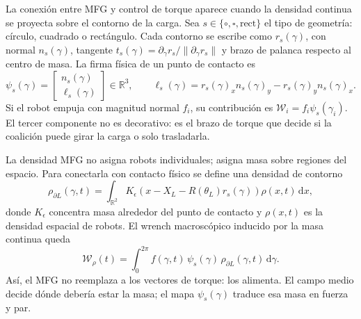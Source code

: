 La conexión entre MFG y control de torque aparece cuando la densidad continua se proyecta
sobre el contorno de la carga. Sea $s\in\{\circ,\square,\mathrm{rect}\}$ el tipo de
geometría: círculo, cuadrado o rectángulo. Cada contorno se escribe como
$r_s(\gamma)$, con normal $n_s(\gamma)$, tangente
$t_s(\gamma)=\partial_\gamma r_s/\|\partial_\gamma r_s\|$ y brazo de palanca respecto al
centro de masa. La firma física de un punto de contacto es
\begin{equation}
  \psi_s(\gamma)
  =
  \begin{bmatrix}
    n_s(\gamma)\\
    \ell_s(\gamma)
  \end{bmatrix}
  \in\mathbb R^3,
  \qquad
  \ell_s(\gamma)
  =
  r_s(\gamma)_x n_s(\gamma)_y
  -
  r_s(\gamma)_y n_s(\gamma)_x .
  \label{eq:ctrl_firma_wrench_contorno}
\end{equation}
Si el robot empuja con magnitud normal $f_i$, su contribución es
$\mathcal W_i=f_i\psi_s(\gamma_i)$. El tercer componente no es decorativo: es el brazo de
torque que decide si la coalición puede girar la carga o solo trasladarla.

La densidad MFG no asigna robots individuales; asigna masa sobre regiones del espacio.
Para conectarla con contacto físico se define una densidad de contorno
\begin{equation}
  \rho_{\partial L}(\gamma,t)
  =
  \int_{\mathbb R^2}
  K_\epsilon\!\left(x-X_L-R(\theta_L)r_s(\gamma)\right)
  \rho(x,t)\,\mathrm dx ,
  \label{eq:ctrl_densidad_mfg_contorno}
\end{equation}
donde $K_\epsilon$ concentra masa alrededor del punto de contacto y $\rho(x,t)$ es la
densidad espacial de robots. El wrench macroscópico inducido por la masa continua queda
\begin{equation}
  \mathcal W_\rho(t)
  =
  \int_0^{2\pi}
  f(\gamma,t)\,
  \psi_s(\gamma)\,
  \rho_{\partial L}(\gamma,t)\,
  \mathrm d\gamma .
  \label{eq:ctrl_wrench_mfg_contorno}
\end{equation}
Así, el MFG no reemplaza a los vectores de torque: los alimenta. El campo medio decide
dónde debería estar la masa; el mapa $\psi_s(\gamma)$ traduce esa masa en fuerza y par.

